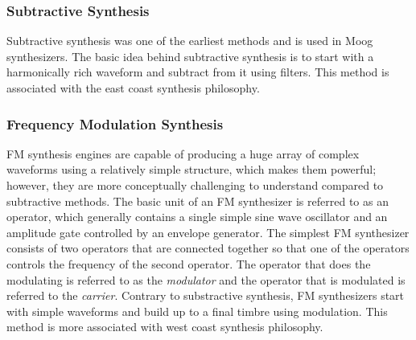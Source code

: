 \subsubsection{Subtractive Synthesis}
Subtractive synthesis was one of the earliest methods and is used in Moog synthesizers. The basic idea behind subtractive synthesis is to start with a harmonically rich waveform and subtract from it using filters. This method is associated with the east coast synthesis philosophy. 


\subsubsection{Frequency Modulation Synthesis}
FM synthesis engines are capable of producing a huge array of complex waveforms using a relatively simple structure, which makes them powerful; however, they are more conceptually challenging to understand compared to subtractive methods. The basic unit of an FM synthesizer is referred to as an operator, which generally contains a single simple sine wave oscillator and an amplitude gate controlled by an envelope generator. The simplest FM synthesizer consists of two operators that are connected together so that one of the operators controls the frequency of the second operator. The operator that does the modulating is referred to as the \textit{modulator} and the operator that is modulated is referred to the \textit{carrier}. Contrary to substractive synthesis, FM synthesizers start with simple waveforms and build up to a final timbre using modulation. This method is more associated with west coast synthesis philosophy.

